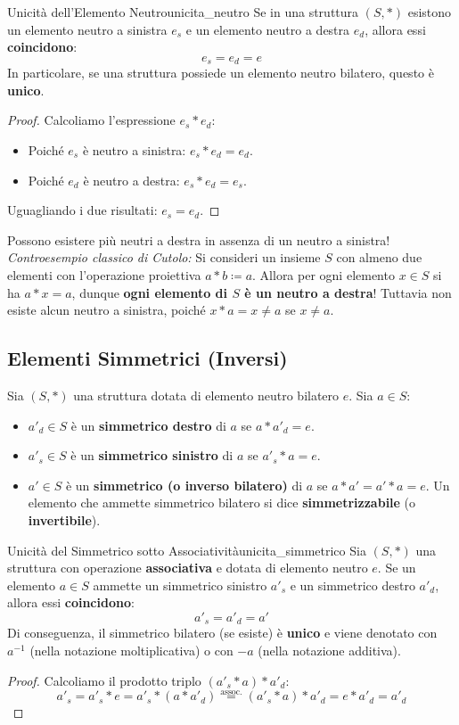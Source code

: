 \begin{teorema}{Unicità dell'Elemento Neutro}{unicita_neutro}
Se in una struttura $(S, *)$ esistono un elemento neutro a sinistra $e_s$ e un elemento neutro a destra $e_d$, allora essi \textbf{coincidono}:
\[
    e_s = e_d = e
\]
In particolare, se una struttura possiede un elemento neutro bilatero, questo è \textbf{unico}.
\end{teorema}
\begin{proof}
Calcoliamo l'espressione $e_s * e_d$:
\begin{itemize}
    \item Poiché $e_s$ è neutro a sinistra: $e_s * e_d = e_d$.
    \item Poiché $e_d$ è neutro a destra: $e_s * e_d = e_s$.
\end{itemize}
Uguagliando i due risultati: $e_s = e_d$.
\end{proof}

\begin{avvisoCutolo}
    Possono esistere più neutri a destra in assenza di un neutro a sinistra!
    \emph{Controesempio classico di Cutolo:} Si consideri un insieme $S$ con almeno due elementi con l'operazione proiettiva $a * b \coloneqq a$.
    Allora per ogni elemento $x \in S$ si ha $a * x = a$, dunque \textbf{ogni elemento di $S$ è un neutro a destra}! Tuttavia non esiste alcun neutro a sinistra, poiché $x * a = x \neq a$ se $x \neq a$.
\end{avvisoCutolo}

\subsection{Elementi Simmetrici (Inversi)}
Sia $(S, *)$ una struttura dotata di elemento neutro bilatero $e$. Sia $a \in S$:
\begin{itemize}
    \item $a'_d \in S$ è un \textbf{simmetrico destro} di $a$ se $a * a'_d = e$.
    \item $a'_s \in S$ è un \textbf{simmetrico sinistro} di $a$ se $a'_s * a = e$.
    \item $a' \in S$ è un \textbf{simmetrico (o inverso bilatero)} di $a$ se $a * a' = a' * a = e$.
    Un elemento che ammette simmetrico bilatero si dice \textbf{simmetrizzabile} (o \textbf{invertibile}).
\end{itemize}

\begin{teorema}{Unicità del Simmetrico sotto Associatività}{unicita_simmetrico}
Sia $(S, *)$ una struttura con operazione \textbf{associativa} e dotata di elemento neutro $e$.
Se un elemento $a \in S$ ammette un simmetrico sinistro $a'_s$ e un simmetrico destro $a'_d$, allora essi \textbf{coincidono}:
\[
    a'_s = a'_d = a'
\]
Di conseguenza, il simmetrico bilatero (se esiste) è \textbf{unico} e viene denotato con $a^{-1}$ (nella notazione moltiplicativa) o con $-a$ (nella notazione additiva).
\end{teorema}
\begin{proof}
Calcoliamo il prodotto triplo $(a'_s * a) * a'_d$:
\[
    a'_s = a'_s * e = a'_s * (a * a'_d) \overset{\text{assoc.}}{=} (a'_s * a) * a'_d = e * a'_d = a'_d
\]
\end{proof}

